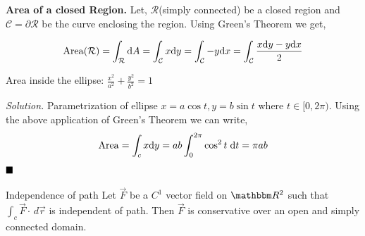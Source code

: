 \documentclass[../Analysis-3]{subfiles}
\begin{document}
\begin{tcolorbox}
    \textbf{Area of a closed Region.} Let, $\mathcal{R}$(simply connected) be a closed region and $\mathcal{C} = \partial{\mathcal{R}}$ be the curve enclosing the region. Using Green's Theorem we get,

    \[\operatorname{Area}(\mathcal{R}) = \int_{\mathcal{R}} \dd A = \int_{\mathcal{C}} x \dd y = \int_{\mathcal{C}} -y \dd x = \int_{\mathcal{C}} \frac{x \dd y -y \dd x}{2} \]

\end{tcolorbox}

\begin{Eg}{Area inside the ellipse: $\frac{x^2}{a^2} + \frac{y^2}{b^2} = 1$}{}

    \textit{Solution.} Parametrization of ellipse $x = a \cos t, y = b \sin t$ where $t \in [0,2\pi)$. Using the above application of Green's Theorem we can write,
    \[\operatorname{Area} = \int_c x \dd y = ab \int_{0}^{2\pi} \cos^2t \hspace{0.1cm}\dd t = \pi ab \]
    $\hfill \blacksquare$
\end{Eg}

\begin{Thm}{Independence of path}{}
    Let $\vec{F}$ be a $C^1$ vector field on $\R^2$ such that $\int_c \vec{F} \cdot \,d \vec{r}$ is independent of path. Then $\vec{F}$ is conservative over an open and simply connected domain.
\end{Thm}
\end{document}
